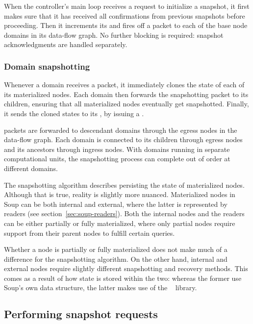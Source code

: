 When the controller's main loop receives a request to initialize a snapshot, it
first makes sure that it has received all confirmations from previous snapshots
before proceeding. Then it increments its  and fires off a
 packet to each of the base node domains in its data-flow
graph. No further blocking is required: snapshot acknowledgments are handled
separately.

\subsubsection{Domain snapshotting}

Whenever a domain receives a  packet, it immediately clones
the state of each of its materialized nodes. Each domain then forwards the
snapshotting packet to its children, ensuring that all materialized
nodes eventually get snapshotted. Finally, it sends the cloned states to its
, by issuing a .

 packets are forwarded to descendant domains through the
egress nodes in the data-flow graph. Each domain is connected to its children
through egress nodes and its ancestors through ingress nodes. With domains
running in separate computational units, the snapshotting process can complete
out of order at different domains.


The snapshotting algorithm describes persisting the state of materialized nodes.
Although that is true, reality is slightly more nuanced. Materialized nodes in
Soup can be both internal and external, where the latter is represented by
readers (see section~\ref{sec:soup-readers}). Both the internal nodes and the
readers can be either partially or fully materialized, where only partial nodes
require support from their parent nodes to fulfill certain queries.

Whether a node is partially or fully materialized does not make much of a
difference for the snapshotting algorithm. On the other hand, internal and
external nodes require slightly different snapshotting and recovery methods.
This comes as a result of how state is stored within the two: whereas the former
use Soup's own  data structure, the latter makes use of the
~\cite{evmap} library.

\subsection{Performing snapshot requests}

